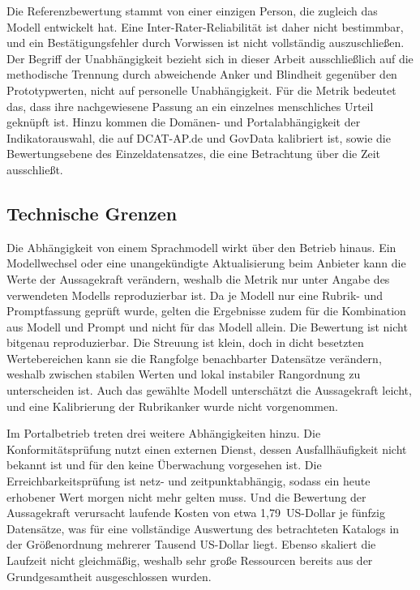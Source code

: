 Die Referenzbewertung stammt von einer einzigen Person, die zugleich das Modell
entwickelt hat. Eine Inter-Rater-Reliabilität ist daher nicht bestimmbar, und ein
Bestätigungsfehler durch Vorwissen ist nicht vollständig auszuschließen. Der
Begriff der Unabhängigkeit bezieht sich in dieser Arbeit ausschließlich auf die
methodische Trennung durch abweichende Anker und Blindheit gegenüber den
Prototypwerten, nicht auf personelle Unabhängigkeit. Für die Metrik bedeutet das,
dass ihre nachgewiesene Passung an ein einzelnes menschliches Urteil geknüpft
ist. Hinzu kommen die Domänen- und Portalabhängigkeit der Indikatorauswahl, die
auf DCAT-AP.de und GovData kalibriert ist, sowie die Bewertungsebene des
Einzeldatensatzes, die eine Betrachtung über die Zeit ausschließt.

\subsection{Technische Grenzen}
Die Abhängigkeit von einem Sprachmodell wirkt über den Betrieb hinaus. Ein
Modellwechsel oder eine unangekündigte Aktualisierung beim Anbieter kann die Werte der Aussagekraft verändern, weshalb die Metrik nur unter Angabe des verwendeten
Modells reproduzierbar ist. Da je Modell nur eine Rubrik- und Promptfassung
geprüft wurde, gelten die Ergebnisse zudem für die Kombination aus Modell und
Prompt und nicht für das Modell allein. Die Bewertung ist nicht bitgenau
reproduzierbar. Die Streuung ist klein, doch in dicht besetzten Wertebereichen
kann sie die Rangfolge benachbarter Datensätze verändern, weshalb zwischen
stabilen Werten und lokal instabiler Rangordnung zu unterscheiden ist. Auch das
gewählte Modell unterschätzt die Aussagekraft leicht, und eine Kalibrierung der
Rubrikanker wurde nicht vorgenommen.

Im Portalbetrieb treten drei weitere Abhängigkeiten hinzu. Die
Konformitätsprüfung nutzt einen externen Dienst, dessen Ausfallhäufigkeit nicht
bekannt ist und für den keine Überwachung vorgesehen ist. Die
Erreichbarkeitsprüfung ist netz- und zeitpunktabhängig, sodass ein heute
erhobener Wert morgen nicht mehr gelten muss. Und die Bewertung der Aussagekraft
verursacht laufende Kosten von etwa 1{,}79~US-Dollar je fünfzig Datensätze, was
für eine vollständige Auswertung des betrachteten Katalogs in der Größenordnung
mehrerer Tausend US-Dollar liegt. Ebenso skaliert die Laufzeit nicht
gleichmäßig, weshalb sehr große Ressourcen bereits aus der Grundgesamtheit
ausgeschlossen wurden.

